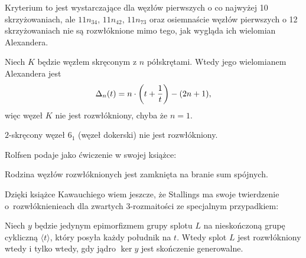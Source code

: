 
Kryterium to jest wystarczające dla węzłów pierwszych o co najwyżej 10 skrzyżowaniach, ale $11n_{34}$, $11n_{42}$, $11n_{73}$ oraz osiemnaście węzłów pierwszych o 12 skrzyżowaniach nie są rozwłóknione mimo tego, jak wygląda ich wielomian Alexandera.

\begin{example}
%
    Niech $K$ będzie węzłem skręconym z $n$ półskrętami.
%
    Wtedy jego wielomianem Alexandera jest
    \begin{equation}
        \Delta_n(t) = n \cdot \left(t + \frac 1 t \right) - (2n+1),
    \end{equation}
    więc węzeł $K$ nie jest rozwłókniony, chyba że $n = 1$.
\end{example}

\begin{corollary}
    $2$-skręcony węzeł $6_1$ (węzeł dokerski) nie jest rozwłókniony.
\end{corollary}

Rolfsen \cite[s. 326]{rolfsen76} podaje jako ćwiczenie w swojej książce:

\begin{proposition}
%
    Rodzina węzłów rozwłóknionych jest zamknięta na branie sum spójnych.
\end{proposition}

Dzięki książce Kawauchiego \cite[s. 84]{kawauchi96} wiem jeszcze, że Stallings ma swoje twierdzenie o~rozwłóknienieach dla zwartych 3-rozmaitości ze specjalnym przypadkiem:

\begin{proposition}
    Niech $y$ będzie jedynym epimorfizmem grupy splotu $L$ na nieskończoną grupę cykliczną $\langle t \rangle$, który posyła każdy południk na $t$. %
    Wtedy splot $L$ jest rozwłókniony wtedy i tylko wtedy, gdy jądro $\ker y$ jest skończenie generowalne.
\end{proposition}

%


